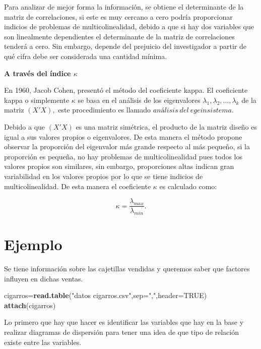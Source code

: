 \documentclass[
  a4paper,
  oneside,
  openany]{book}
\newenvironment{Shaded}{\begin{snugshade}}{\end{snugshade}}
\newcommand{\AttributeTok}[1]{\textcolor[rgb]{0.13,0.29,0.53}{#1}}
\newcommand{\ConstantTok}[1]{\textcolor[rgb]{0.56,0.35,0.01}{#1}}
\newcommand{\FunctionTok}[1]{\textcolor[rgb]{0.13,0.29,0.53}{\textbf{#1}}}
\newcommand{\NormalTok}[1]{#1}
\newcommand{\OtherTok}[1]{\textcolor[rgb]{0.56,0.35,0.01}{#1}}
\newcommand{\StringTok}[1]{\textcolor[rgb]{0.31,0.60,0.02}{#1}}
\begin{document}
Para analizar de mejor forma la información, se obtiene el determinante de la matriz de correlaciones, si este es muy cercano a cero podría proporcionar indicios de problemas de multicolinealidad, debido a que si hay dos variables que son linealmente dependientes el determinante de la matriz de correlaciones tenderá a cero. Sin embargo, depende del prejuicio del investigador a partir de qué cifra debe ser considerada una cantidad mínima.

\textbf{A través del índice \(\kappa\)}

En 1960, Jacob Cohen, presentó el método del coeficiente kappa. El coeficiente kappa o simplemente \(\kappa\) se basa en el análisis de los eigenvalores \(\lambda_{1},\lambda_{2},\ldots,\lambda_{k}\) de la matriz \((X'X),\) este procedimiento es llamado \(análisis \ del \ egeinsistema.\)

Debido a que \((X'X)\) es una matriz simétrica, el producto de la matriz diseño es igual a sus valores propios o eigenvalores. De esta manera el método propone observar la proporción del eigenvalor más grande respecto al más pequeño, si la proporción es pequeña, no hay problemas de multicolinealidad pues todos los valores propios son similares, sin embargo, proporciones altas indican gran variabilidad en los valores propios por lo que se tiene indicios de multicolinealidad.
De esta manera el coeficiente \(\kappa\) es calculado como:

\[\kappa=\frac{\lambda_{max}}{\lambda_{min}}.\]

\hypertarget{ejemplo-20}{%
\section{Ejemplo}\label{ejemplo-20}}

Se tiene información sobre las cajetillas vendidas y queremos saber que factores influyen en dichas ventas.

\begin{Shaded}
\begin{Highlighting}[]
\NormalTok{cigarros}\OtherTok{=}\FunctionTok{read.table}\NormalTok{(}\StringTok{"datos cigarros.csv"}\NormalTok{,}\AttributeTok{sep=}\StringTok{","}\NormalTok{,}\AttributeTok{header=}\ConstantTok{TRUE}\NormalTok{)}
\FunctionTok{attach}\NormalTok{(cigarros)}
\end{Highlighting}
\end{Shaded}

Lo primero que hay que hacer es identificar las variables que hay en la base y realizar diagramas de dispersión para tener una idea de que tipo de relación existe entre las variables.
\end{document}
